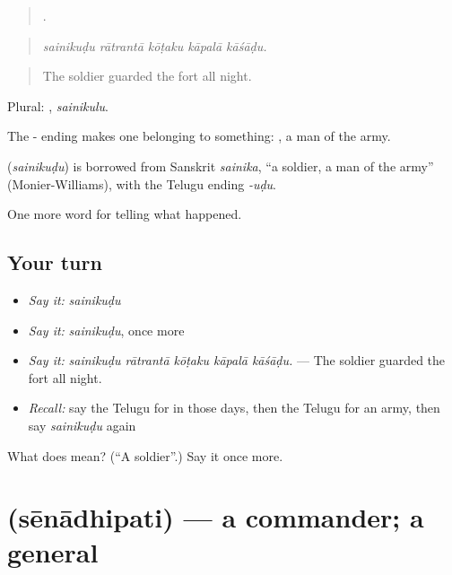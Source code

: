 \begin{quote}
    .
\end{quote}

\begin{quote}
\emph{sainikuḍu rātrantā kōṭaku kāpalā kāśāḍu.}
\end{quote}

\begin{quote}
The soldier guarded the fort all night.
\end{quote}

Plural: , \emph{sainikulu}.

The - ending makes one belonging to something: , a man of the army.

\begin{cousinweb}
\textbf{} (\emph{sainikuḍu}) is borrowed from Sanskrit \emph{sainika}, \textquotedblleft{}a soldier, a man of the army\textquotedblright{} (Monier-Williams), with the Telugu ending \emph{-uḍu}.
\end{cousinweb}

\begin{grammarlens}[title={What you've built}]
One more word for telling what happened.
\end{grammarlens}

\subsection*{Your turn}
\begin{itemize}
\raggedright
  \item \emph{Say it:} \emph{sainikuḍu}
  \item \emph{Say it:} \emph{sainikuḍu}, once more
  \item \emph{Say it:} \emph{sainikuḍu rātrantā kōṭaku kāpalā kāśāḍu.} — The soldier guarded the fort all night.
  \item \emph{Recall:} say the Telugu for in those days, then the Telugu for an army, then say \emph{sainikuḍu} again
\end{itemize}

\begin{tcolorbox}[breakable,colback=teal!4,colframe=teal!35!black,title={Before you move on}]
What does  mean? (\textquotedblleft{}A soldier\textquotedblright{}.) Say it once more.
\end{tcolorbox}
\section[\texorpdfstring{\te{సేనాధిపతి} (sēnādhipati)}{సేనాధిపతి (sēnādhipati)}]{ (sēnādhipati) — a commander; a general}

